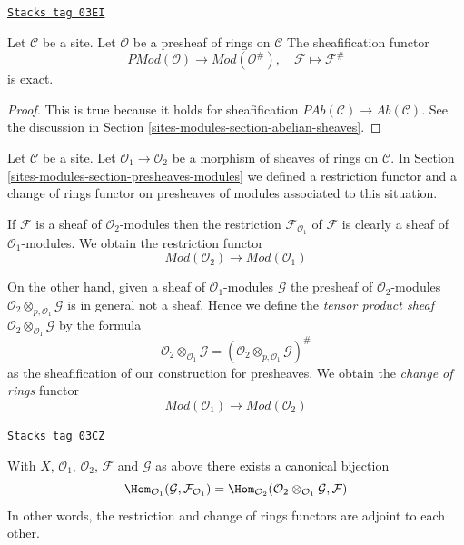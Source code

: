 \begin{lemma}
\label{sites-modules-lemma-sheafification-exact}
\href{https://stacks.math.columbia.edu/tag/03EI}{\texttt{Stacks tag 03EI}}

Let $\mathcal{C}$ be a site.
Let $\mathcal{O}$ be a presheaf of rings on $\mathcal{C}$
The sheafification functor
$$
\textit{PMod}(\mathcal{O}) \longrightarrow \textit{Mod}(\mathcal{O}^\#), \quad
\mathcal{F} \longmapsto \mathcal{F}^\#
$$
is exact.
\end{lemma}

\begin{proof}
This is true because it holds for sheafification
$\textit{PAb}(\mathcal{C}) \to \textit{Ab}(\mathcal{C})$.
See the discussion in Section \ref{sites-modules-section-abelian-sheaves}.
\end{proof}

Let $\mathcal{C}$ be a site.
Let $\mathcal{O}_1 \to \mathcal{O}_2$ be
a morphism of sheaves of rings on $\mathcal{C}$.
In Section \ref{sites-modules-section-presheaves-modules}
we defined a restriction functor
and a change of rings functor on presheaves of modules
associated to this situation.

\medskip\noindent
If $\mathcal{F}$ is a sheaf of $\mathcal{O}_2$-modules
then the restriction $\mathcal{F}_{\mathcal{O}_1}$
of $\mathcal{F}$ is clearly a sheaf
of $\mathcal{O}_1$-modules. We obtain the restriction functor
$$
\textit{Mod}(\mathcal{O}_2)
\longrightarrow
\textit{Mod}(\mathcal{O}_1)
$$

\medskip\noindent
On the other hand, given a sheaf of $\mathcal{O}_1$-modules
$\mathcal{G}$ the presheaf of $\mathcal{O}_2$-modules
$\mathcal{O}_2 \otimes_{p, \mathcal{O}_1} \mathcal{G}$
is in general not a sheaf. Hence we define the
{\it tensor product sheaf}
$\mathcal{O}_2 \otimes_{\mathcal{O}_1} \mathcal{G}$
by the formula
$$
\mathcal{O}_2 \otimes_{\mathcal{O}_1} \mathcal{G}
=
(\mathcal{O}_2 \otimes_{p, \mathcal{O}_1} \mathcal{G})^\#
$$
as the sheafification of our construction for presheaves.
We obtain the {\it change of rings} functor
$$
\textit{Mod}(\mathcal{O}_1)
\longrightarrow
\textit{Mod}(\mathcal{O}_2)
$$

\begin{lemma}
\label{sites-modules-lemma-adjointness-tensor-restrict}
\href{https://stacks.math.columbia.edu/tag/03CZ}{\texttt{Stacks tag 03CZ}}

With $X$, $\mathcal{O}_1$, $\mathcal{O}_2$, $\mathcal{F}$ and
$\mathcal{G}$ as above there exists a canonical bijection
$$
\Hom_{\mathcal{O}_1}(\mathcal{G}, \mathcal{F}_{\mathcal{O}_1})
=
\Hom_{\mathcal{O}_2}(
\mathcal{O}_2 \otimes_{\mathcal{O}_1} \mathcal{G},
\mathcal{F}
)
$$
In other words, the restriction and change of rings functors
are adjoint to each other.
\end{lemma}

